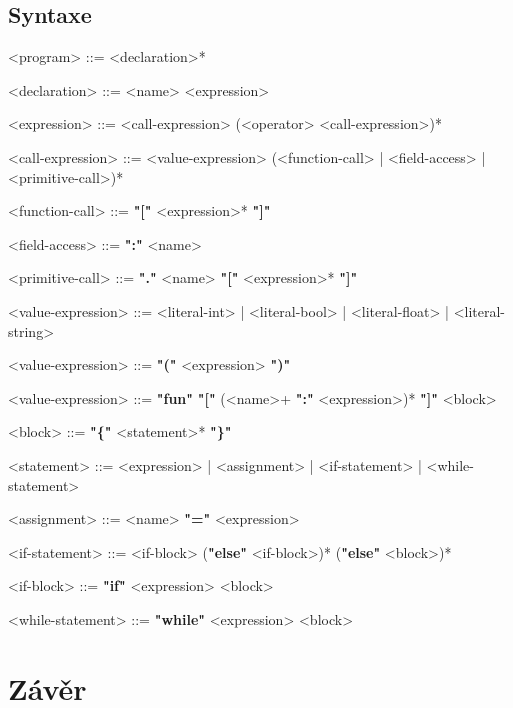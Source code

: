 \documentclass[a4paper,12pt]{article}
\def\emphasis #1{\textbf{"#1"}}
\begin{document}
\subsection{Syntaxe}
\begin{grammar}
<program> ::= <declaration>*

<declaration> ::= <name> <expression>

<expression> ::= <call-expression> (<operator> <call-expression>)*

<call-expression> ::= <value-expression> (<function-call> | <field-access> | <primitive-call>)*

<function-call> ::= \emphasis{[} <expression>* \emphasis{]}

<field-access> ::= \emphasis{:} <name>

<primitive-call> ::= \emphasis{.} <name> \emphasis{[} <expression>* \emphasis{]}

<value-expression> ::= <literal-int> | <literal-bool> | <literal-float> | <literal-string>

<value-expression> ::= \emphasis{(} <expression> \emphasis{)}

<value-expression> ::= \emphasis{fun} \emphasis{[} (<name>+ \emphasis{:} <expression>)* \emphasis{]} <block>

<block> ::= \emphasis{\{} <statement>* \emphasis{\}}

<statement> ::= <expression> | <assignment> | <if-statement> | <while-statement>

<assignment> ::= <name> \emphasis{=} <expression>

<if-statement> ::= <if-block> (\emphasis{else} <if-block>)* (\emphasis{else} <block>)*

<if-block> ::= \emphasis{if} <expression> <block>

<while-statement> ::= \emphasis{while} <expression> <block>
\end{grammar} 

\section{Závěr}

\newpage
\printbibliography[heading=bibintoc, title={Použitá literatura}]
\newpage
\end{document}
